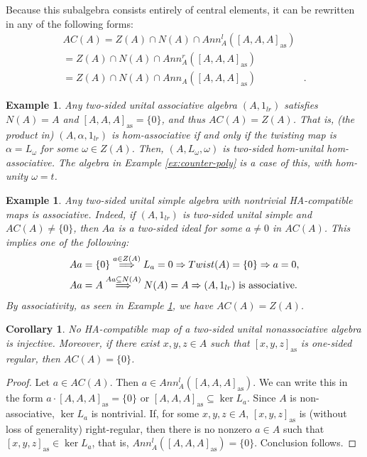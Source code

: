 \documentclass[12pt]{article}
\newtheorem{corollary}[theorem]{Corollary}
\newtheorem{example}[theorem]{Example}
\begin{document}
		Because this subalgebra consists entirely of central elements, it can be rewritten in any of the following forms:
		\begin{align*}
			AC(A)=Z(A)\cap N(A)\cap Ann_A^l([A,A,A]_{\mathrm{as}})& \\
			=Z(A)\cap N(A)\cap Ann_A^r([A,A,A]_{\mathrm{as}})&\\
			=Z(A)\cap N(A)\cap Ann_A([A,A,A]_{\mathrm{as}})&.
		\end{align*}
		
		\begin{example}\label{ex:two_sided_unital_associative}
			Any two-sided unital associative algebra $(A,1_{lr})$ satisfies $N(A)=A$ and $[A,A,A]_{\mathrm{as}}=\{0\}$, and thus
			$AC(A)=Z(A)$. That is, (the product in) $(A,\alpha,1_{lr})$ is hom-associative if and only if the twisting map is $\alpha=L_\omega$ for some $\omega\in Z(A)$. Then, $(A,L_\omega,\omega)$ is two-sided hom-unital hom-associative. The algebra in Example \ref{ex:counter-poly} is a case of this, with hom-unity $\omega=t$.
		\end{example}
		
		
		\begin{example}\label{ex:two_sided_unital_simple}
			Any two-sided unital simple algebra with nontrivial HA-compatible maps is associative. Indeed, if $(A,1_{lr})$ is two-sided unital simple and $AC(A)\neq\{0\}$, then $Aa$ is a two-sided ideal for some $a\neq 0$ in $AC(A)$. This implies one of the following:
			\begin{align*}
				A a&=\{0\}\overset{a\in Z(A)}{\Longrightarrow} L_a=0\Rightarrow Twist(A)=\{0\}\Rightarrow a=0,\\
				A a&= A \overset{ A a\subseteq N(A)}{\Longrightarrow} N(A)= A \Rightarrow (A,1_{lr}) \textnormal{ is associative.}
			\end{align*}
			By associativity, as seen in Example \ref{ex:two_sided_unital_associative}, we have $AC(A)=Z(A)$.
		\end{example}
		
		\begin{corollary}\label{cor:HA_non_injective}
			No HA-compatible map of a two-sided unital nonassociative algebra is injective. Moreover, if there exist $x,y,z\in A$ such that $[x,y,z]_{\mathrm{as}}$ is one-sided regular, then $AC(A)=\{0\}$.
		\end{corollary}
		\begin{proof}
			Let $a\in AC(A)$. Then $a\in Ann_A^l([A,A,A]_{\mathrm{as}})$. We can write this in the form $a\cdot [A,A,A]_{\mathrm{as}}=\{0\}$ or $[A,A,A]_{\mathrm{as}}\subseteq\ker L_a$. Since $A$ is non-associative,  $\ker L_a$ is nontrivial. If, for some $x,y,z\in A$,  $[x,y,z]_{\mathrm{as}}$ is (without loss of generality) right-regular, then there is no nonzero $a\in A$ such that $[x,y,z]_{\mathrm{as}}\in \ker L_a$, that is, $Ann_A^l([A,A,A]_{\mathrm{as}})=\{0\}$. Conclusion follows.
		\end{proof}
		
\end{document}
